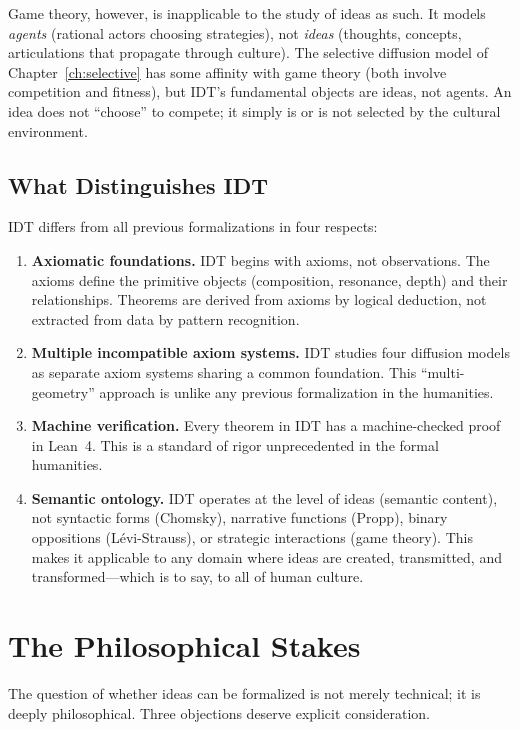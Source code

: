 \documentclass[11pt,openany]{book}
\theoremstyle{definition}
\theoremstyle{plain}
\theoremstyle{remark}
\begin{document}
Game theory, however, is inapplicable to the study of ideas as such. It models \emph{agents} (rational actors choosing strategies), not \emph{ideas} (thoughts, concepts, articulations that propagate through culture). The selective diffusion model of Chapter~\ref{ch:selective} has some affinity with game theory (both involve competition and fitness), but IDT's fundamental objects are ideas, not agents. An idea does not ``choose'' to compete; it simply is or is not selected by the cultural environment.

\subsection{What Distinguishes IDT}

IDT differs from all previous formalizations in four respects:

\begin{enumerate}
\item \textbf{Axiomatic foundations.} IDT begins with axioms, not observations. The axioms define the primitive objects (composition, resonance, depth) and their relationships. Theorems are derived from axioms by logical deduction, not extracted from data by pattern recognition.

\item \textbf{Multiple incompatible axiom systems.} IDT studies four diffusion models as separate axiom systems sharing a common foundation. This ``multi-geometry'' approach is unlike any previous formalization in the humanities.

\item \textbf{Machine verification.} Every theorem in IDT has a machine-checked proof in Lean~4. This is a standard of rigor unprecedented in the formal humanities.

\item \textbf{Semantic ontology.} IDT operates at the level of ideas (semantic content), not syntactic forms (Chomsky), narrative functions (Propp), binary oppositions (Lévi-Strauss), or strategic interactions (game theory). This makes it applicable to any domain where ideas are created, transmitted, and transformed---which is to say, to all of human culture.
\end{enumerate}

\section{The Philosophical Stakes}

The question of whether ideas can be formalized is not merely technical; it is deeply philosophical. Three objections deserve explicit consideration.
\end{document}
